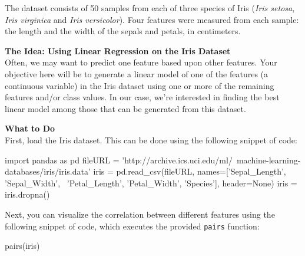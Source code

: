 \documentclass[paper=a4, fontsize=11pt]{scrartcl} %
\numberwithin{equation}{section} %
\numberwithin{figure}{section} %
\numberwithin{table}{section} %
\begin{document}
\vspace{6pt}

The dataset consists of 50 samples from each of three species of Iris (\textit{Iris setosa}, \textit{Iris virginica} and \textit{Iris versicolor}). Four features were measured from each sample:  the length and the width of the sepals and petals, in centimeters.

\vspace{8pt}

\textbf{The Idea:  Using Linear Regression on the Iris Dataset}\\
Often, we may want to predict one feature based upon other features. Your objective here will be to generate a linear model of one of the features (a continuous variable) in the Iris dataset using one or more of the remaining features and/or class values. In our case, we're interested in finding the best linear model among those that can be generated from this dataset.

\vspace{8pt}

\textbf{What to Do}\\
First, load the Iris dataset. This can be done using the following snippet of code:

\vspace{6pt}

\begin{adjustbox}{minipage=0.8\textwidth,margin=0pt \smallskipamount,center}
\begin{python}
import pandas as pd
fileURL = 'http://archive.ics.uci.edu/ml/\
machine-learning-databases/iris/iris.data'
iris = pd.read_csv(fileURL, names=['Sepal_Length', 'Sepal_Width', \
                                   'Petal_Length', 'Petal_Width',
                                   'Species'], header=None)
iris = iris.dropna()
\end{python}
\end{adjustbox}

\vspace{6pt}

Next, you can visualize the correlation between different features using the following snippet of code, which executes the provided \texttt{pairs} function:

\vspace{6pt}

\begin{adjustbox}{minipage=0.8\textwidth,margin=0pt \smallskipamount,center}
\begin{python}
pairs(iris)
\end{python}
\end{adjustbox}
\end{document}

